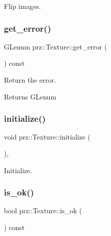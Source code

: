 Flip images. 

\mbox{\label{classprz_1_1_texture_a039881cbfc129c8bc3a1b3ec96ea18f1}} 
\subsubsection{\texorpdfstring{get\_error()}{get\_error()}}
{\footnotesize\ttfamily G\+Lenum prz\+::\+Texture\+::get\+\_\+error (\begin{DoxyParamCaption}{ }\end{DoxyParamCaption}) const\hspace{0.3cm}{\ttfamily [inline]}}



Return the error. 

\begin{DoxyReturn}{Returns}
G\+Lenum 
\end{DoxyReturn}
\mbox{\label{classprz_1_1_texture_ac30711bd35724f1044cbdbf4644d1df1}} 
\subsubsection{\texorpdfstring{initialize()}{initialize()}}
{\footnotesize\ttfamily void prz\+::\+Texture\+::initialize (\begin{DoxyParamCaption}{ }\end{DoxyParamCaption})\hspace{0.3cm}{\ttfamily [protected]}, {\ttfamily [virtual]}}



Initialize. 

\mbox{\label{classprz_1_1_texture_a25f1084494684ad127094b7a48a5c003}} 
\subsubsection{\texorpdfstring{is\_ok()}{is\_ok()}}
{\footnotesize\ttfamily bool prz\+::\+Texture\+::is\+\_\+ok (\begin{DoxyParamCaption}{ }\end{DoxyParamCaption}) const\hspace{0.3cm}{\ttfamily [inline]}}



